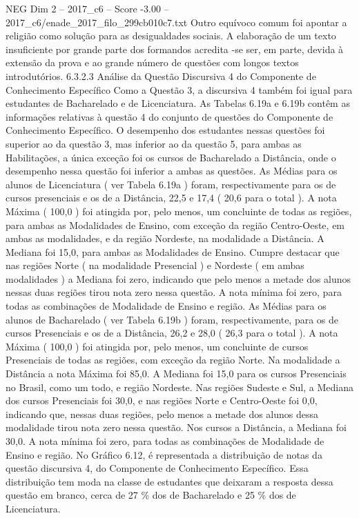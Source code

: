 \begin{textsample}{NEG Dim 2 – 2017\_c6 – Score -3.00 – 2017\_c6/enade\_2017\_filo\_299cb010c7.txt}
Outro equívoco comum foi apontar a religião como solução para as desigualdades sociais.
A elaboração de um texto insuficiente por grande parte dos formandos acredita -se ser, em parte, devida à extensão da prova e ao grande número de questões com longos textos introdutórios. 6.3.2.3 Análise da Questão Discursiva 4 do Componente de Conhecimento Específico Como a Questão 3, a discursiva 4 também foi igual para estudantes de Bacharelado e de Licenciatura.
As Tabelas 6.19a e 6.19b contêm as informações relativas à questão 4 do conjunto de questões do Componente de Conhecimento Específico.
O desempenho dos estudantes nessas questões foi superior ao da questão 3, mas inferior ao da questão 5, para ambas as Habilitações, a única exceção foi os cursos de Bacharelado a Distância, onde o desempenho nessa questão foi inferior a ambas as questões.
As Médias para os alunos de Licenciatura ( ver Tabela 6.19a ) foram, respectivamente para os de cursos presenciais e os de a Distância, 22,5 e 17,4 ( 20,6 para o total ).
A nota Máxima ( 100,0 ) foi atingida por, pelo menos, um concluinte de todas as regiões, para ambas as Modalidades de Ensino, com exceção da região Centro-Oeste, em ambas as modalidades, e da região Nordeste, na modalidade a Distância.
A Mediana foi 15,0, para ambas as Modalidades de Ensino.
Cumpre destacar que nas regiões Norte ( na modalidade Presencial ) e Nordeste ( em ambas modalidades ) a Mediana foi zero, indicando que pelo menos a metade dos alunos nessas duas regiões tirou nota zero nessa questão.
A nota mínima foi zero, para todas as combinações de Modalidade de Ensino e região.
As Médias para os alunos de Bacharelado ( ver Tabela 6.19b ) foram, respectivamente, para os de cursos Presenciais e os de a Distância, 26,2 e 28,0 ( 26,3 para o total ).
A nota Máxima ( 100,0 ) foi atingida por, pelo menos, um concluinte de cursos Presenciais de todas as regiões, com exceção da região Norte.
Na modalidade a Distância a nota Máxima foi 85,0.
A Mediana foi 15,0 para os cursos Presenciais no Brasil, como um todo, e região Nordeste.
Nas regiões Sudeste e Sul, a Mediana dos cursos Presenciais foi 30,0, e nas regiões Norte e Centro-Oeste foi 0,0, indicando que, nessas duas regiões, pelo menos a metade dos alunos dessa modalidade tirou nota zero nessa questão.
Nos cursos a Distância, a Mediana foi 30,0.
A nota mínima foi zero, para todas as combinações de Modalidade de Ensino e região.
No Gráfico 6.12, é representada a distribuição de notas da questão discursiva 4, do Componente de Conhecimento Específico.
Essa distribuição tem moda na classe de estudantes que deixaram a resposta dessa questão em branco, cerca de 27 \% dos de Bacharelado e 25 \% dos de Licenciatura.

\end{textsample}
